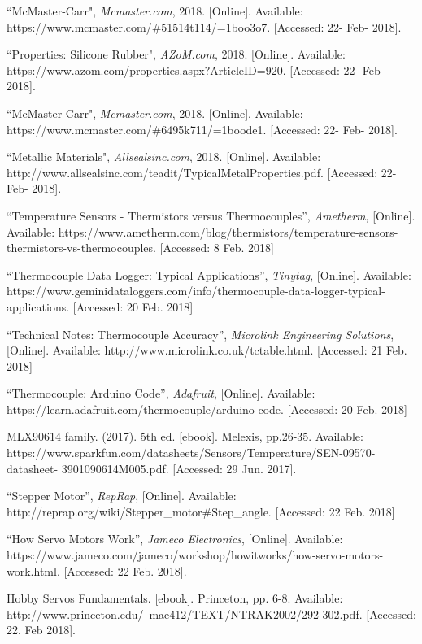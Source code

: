 \documentclass[11pt]{article}
\begin{document}
\begin{thebibliography}{0}
``McMaster-Carr", \textit{Mcmaster.com}, 2018. [Online]. Available: https://www.mcmaster.com/\#51514t114/=1boo3o7. [Accessed: 22- Feb- 2018].

``Properties: Silicone Rubber", \textit{AZoM.com}, 2018. [Online]. Available: https://www.azom.com/properties.aspx?ArticleID=920. [Accessed: 22- Feb- 2018].

``McMaster-Carr", \textit{Mcmaster.com}, 2018. [Online]. Available: https://www.mcmaster.com/\#6495k711/=1boode1. [Accessed: 22- Feb- 2018].

``Metallic Materials", \textit{Allsealsinc.com}, 2018. [Online]. Available: http://www.allsealsinc.com/teadit/TypicalMetalProperties.pdf. [Accessed: 22- Feb- 2018].

``Temperature Sensors - Thermistors versus Thermocouples”, \textit{Ametherm}, [Online]. Available: https://www.ametherm.com/blog/thermistors/temperature-sensors-thermistors-vs-thermocouples. [Accessed: 8 Feb. 2018]

``Thermocouple Data Logger: Typical Applications”, \textit{Tinytag}, [Online]. Available: https://www.geminidataloggers.com/info/thermocouple-data-logger-typical-applications. [Accessed: 20 Feb. 2018]

``Technical Notes: Thermocouple Accuracy”, \textit{Microlink Engineering Solutions}, [Online]. Available: http://www.microlink.co.uk/tctable.html. [Accessed: 21 Feb. 2018]

``Thermocouple: Arduino Code”, \textit{Adafruit}, [Online]. Available: https://learn.adafruit.com/thermocouple/arduino-code. [Accessed: 20 Feb. 2018]

MLX90614 family. (2017). 5th ed. [ebook]. Melexis, pp.26-35. Available:
https://www.sparkfun.com/datasheets/Sensors/Temperature/SEN-09570-datasheet-
3901090614M005.pdf. [Accessed: 29 Jun. 2017].

``Stepper Motor”, \textit{RepRap}, [Online]. Available: http://reprap.org/wiki/Stepper\_motor\#Step\_angle. [Accessed: 22 Feb. 2018]

``How Servo Motors Work”, \textit{Jameco Electronics}, [Online]. Available: https://www.jameco.com/jameco/workshop/howitworks/how-servo-motors-work.html. [Accessed: 22 Feb. 2018].

Hobby Servos Fundamentals. [ebook]. Princeton, pp. 6-8. Available: http://www.princeton.edu/~mae412/TEXT/NTRAK2002/292-302.pdf. [Accessed: 22. Feb 2018].


\end{thebibliography}
\end{document}
